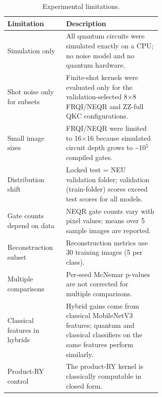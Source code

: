 \begin{table}[htbp]
\centering
\caption{Experimental limitations.}
\label{tab:limitations}
\begin{tabular}{lp{0.62\linewidth}}
\toprule
\textbf{Limitation} & \textbf{Description} \\
\midrule
Simulation only & All quantum circuits were simulated exactly on a CPU; no noise model and no quantum hardware. \\
Shot noise only for subsets & Finite-shot kernels were evaluated only for the validation-selected 8$\times$8 FRQI/NEQR and ZZ-full QKC configurations. \\
Small image sizes & FRQI/NEQR were limited to 16$\times$16 because simulated circuit depth grows to \textasciitilde{}10$^5$ compiled gates. \\
Distribution shift & Locked test = NEU validation folder; validation (train-folder) scores exceed test scores for all models. \\
Gate counts depend on data & NEQR gate counts vary with pixel values; means over 5 sample images are reported. \\
Reconstruction subset & Reconstruction metrics use 30 training images (5 per class). \\
Multiple comparisons & Per-seed McNemar p-values are not corrected for multiple comparisons. \\
Classical features in hybrids & Hybrid gains come from classical MobileNetV3 features; quantum and classical classifiers on the same features perform similarly. \\
Product-RY control & The product-RY kernel is classically computable in closed form. \\
\bottomrule
\end{tabular}
\end{table}
